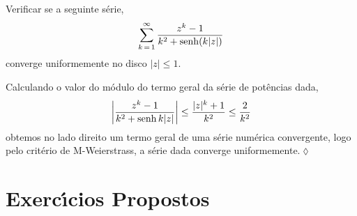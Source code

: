 \begin{exer}
Verificar se a seguinte s\'{e}rie,
\begin{equation*}
\sum_{k\, =\, 1}^{\infty}\dfrac{z^{k}-1}{k^{2}+\operatorname{senh}(k|z|)}
\end{equation*}
converge uniformemente no disco $|z|\le 1$.
\end{exer}

\solo Calculando o valor do m\'{o}dulo do termo geral da s\'{e}rie de
pot\^{e}ncias dada,
\begin{equation*}
    \left|\frac{z^k-1}{k^2+\operatorname{senh} k|z|}\right|\le
    \frac{|z|^k+1}{k^2}\le \frac{2}{k^2}
\end{equation*}
obtemos no lado direito um termo geral de uma s\'{e}rie num\'{e}rica
convergente, logo pelo crit\'{e}rio de M-Weierstrass, a s\'{e}rie dada
converge uniformemente.\hfill \(\lozenge\)

\section*{Exerc\'{\i}cios Propostos} 

